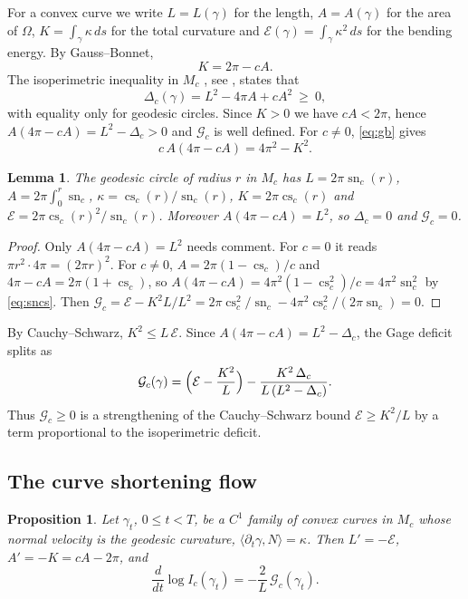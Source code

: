 \documentclass[11pt]{amsart}
\newtheorem{lemma}[theorem]{Lemma}
\newtheorem{proposition}[theorem]{Proposition}
\theoremstyle{definition}
\theoremstyle{remark}
\numberwithin{equation}{section}
\DeclareMathOperator{\sn}{sn}
\DeclareMathOperator{\cs}{cs}
\newcommand{\E}{\mathcal{E}}
\newcommand{\G}{\mathcal{G}}
\begin{document}
For a convex curve we write $L=L(\gamma)$ for the length, $A=A(\gamma)$ for the area of $\Omega$, $K=\int_\gamma\kappa\,ds$ for the total curvature and $\E(\gamma)=\int_\gamma\kappa^2\,ds$ for the bending energy. By Gauss--Bonnet,
\begin{equation}\label{eq:gb}
K=2\pi-cA .
\end{equation}
The isoperimetric inequality in $M_c$ \cite{Be05,Sc39}, see \cite{Os78}, states that
\begin{equation}\label{eq:iso}
\Delta_c(\gamma)=L^2-4\pi A+cA^2\ \ge\ 0,
\end{equation}
with equality only for geodesic circles. Since $K>0$ we have $cA<2\pi$, hence $A(4\pi-cA)=L^2-\Delta_c>0$ and $\G_c$ is well defined. For $c\neq0$, \eqref{eq:gb} gives
\begin{equation}\label{eq:4pi2}
c\,A(4\pi-cA)=4\pi^2-K^2 .
\end{equation}

\begin{lemma}\label{lem:circles}
The geodesic circle of radius $r$ in $M_c$ has $L=2\pi\sn_c(r)$, $A=2\pi\int_0^r\sn_c$, $\kappa=\cs_c(r)/\sn_c(r)$, $K=2\pi\cs_c(r)$ and $\E=2\pi\cs_c(r)^2/\sn_c(r)$. Moreover $A(4\pi-cA)=L^2$, so $\Delta_c=0$ and $\G_c=0$.
\end{lemma}

\begin{proof}
Only $A(4\pi-cA)=L^2$ needs comment. For $c=0$ it reads $\pi r^2\cdot4\pi=(2\pi r)^2$. For $c\ne0$, $A=2\pi(1-\cs_c)/c$ and $4\pi-cA=2\pi(1+\cs_c)$, so $A(4\pi-cA)=4\pi^2(1-\cs_c^2)/c=4\pi^2\sn_c^2$ by \eqref{eq:sncs}. Then $\G_c=\E-K^2L/L^2=2\pi\cs_c^2/\sn_c-4\pi^2\cs_c^2/(2\pi\sn_c)=0$.
\end{proof}

By Cauchy--Schwarz, $K^2\le L\,\E$. Since $A(4\pi-cA)=L^2-\Delta_c$, the Gage deficit splits as
\begin{equation}\label{eq:cs-split}
\G_c(\gamma)=\Bigl(\E-\frac{K^2}{L}\Bigr)-\frac{K^2\,\Delta_c}{L\,(L^2-\Delta_c)} .
\end{equation}
Thus $\G_c\ge0$ is a strengthening of the Cauchy--Schwarz bound $\E\ge K^2/L$ by a term proportional to the isoperimetric deficit.

\subsection{The curve shortening flow}

\begin{proposition}\label{prop:csf}
Let $\gamma_t$, $0\le t<T$, be a $C^1$ family of convex curves in $M_c$ whose normal velocity is the geodesic curvature, $\langle\partial_t\gamma,N\rangle=\kappa$. Then $L'=-\E$, $A'=-K=cA-2\pi$, and
\[
\frac{d}{dt}\log I_c(\gamma_t)=-\frac{2}{L}\,\G_c(\gamma_t).
\]
\end{proposition}
\end{document}
